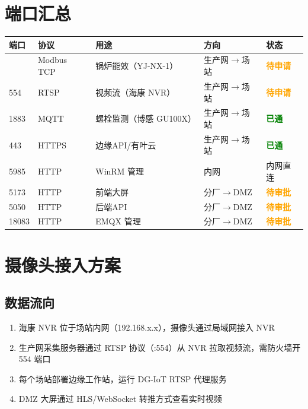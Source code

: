 \documentclass[12pt,a4paper]{ctexart}
\newcommand{\statusok}{\textcolor{green}{\textbf{已通}}}
\newcommand{\statuspending}{\textcolor{orange}{\textbf{待申请}}}
\newcommand{\statusapprove}{\textcolor{orange}{\textbf{待审批}}}
\begin{document}
\section{端口汇总}

\begin{longtable}{p{1cm} p{1.5cm} p{3.5cm} p{3.5cm} p{2cm}}
\toprule
\textbf{端口} & \textbf{协议} & \textbf{用途} & \textbf{方向} & \textbf{状态} \\
\midrule
\endhead
\bottomrule
\endfoot
502 & Modbus TCP & 锅炉能效（YJ-NX-1） & 生产网$\rightarrow$场站 & \statuspending \\
554 & RTSP & 视频流（海康 NVR） & 生产网$\rightarrow$场站 & \statuspending \\
1883 & MQTT & 螺栓监测（博感 GU100X） & 生产网$\rightarrow$场站 & \statusok \\
443 & HTTPS & 边缘API/有叶云 & 生产网$\rightarrow$场站 & \statusok \\
5985 & HTTP & WinRM 管理 & 内网 & 内网直连 \\
5173 & HTTP & 前端大屏 & 分厂$\rightarrow$DMZ & \statusapprove \\
5050 & HTTP & 后端API & 分厂$\rightarrow$DMZ & \statusapprove \\
18083 & HTTP & EMQX 管理 & 分厂$\rightarrow$DMZ & \statusapprove \\
\end{longtable}

\section{摄像头接入方案}

\subsection{数据流向}

\begin{enumerate}[leftmargin=*]
  \item 海康 NVR 位于场站内网（192.168.x.x），摄像头通过局域网接入 NVR
  \item 生产网采集服务器通过 RTSP 协议（:554）从 NVR 拉取视频流，需防火墙开 554 端口
  \item 每个场站部署边缘工作站，运行 DG-IoT RTSP 代理服务
  \item DMZ 大屏通过 HLS/WebSocket 转推方式查看实时视频
\end{enumerate}
\end{document}
